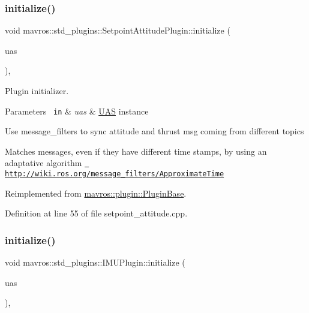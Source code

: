 \subsubsection{\texorpdfstring{initialize()}{initialize()}\hspace{0.1cm}{\footnotesize\ttfamily [31/41]}}
{\footnotesize\ttfamily void mavros\+::std\+\_\+plugins\+::\+Setpoint\+Attitude\+Plugin\+::initialize (\begin{DoxyParamCaption}\item[{\mbox{\hyperlink{classmavros_1_1UAS}{U\+AS}} \&}]{uas }\end{DoxyParamCaption})\hspace{0.3cm}{\ttfamily [inline]}, {\ttfamily [virtual]}}



Plugin initializer. 


\begin{DoxyParams}[1]{Parameters}
\mbox{\texttt{ in}}  & {\em uas} & {\ttfamily \mbox{\hyperlink{classmavros_1_1UAS}{U\+AS}}} instance \\
\hline
\end{DoxyParams}
Use message\+\_\+filters to sync attitude and thrust msg coming from different topics

Matches messages, even if they have different time stamps, by using an adaptative algorithm \href{http://wiki.ros.org/message_filters/ApproximateTime}{\texttt{ http\+://wiki.\+ros.\+org/message\+\_\+filters/\+Approximate\+Time}}

Reimplemented from \mbox{\hyperlink{group__plugin_gad5313a41da4d26acbbabf008cdc21e82}{mavros\+::plugin\+::\+Plugin\+Base}}.



Definition at line 55 of file setpoint\+\_\+attitude.\+cpp.

\mbox{\label{group__plugin_ga93f6f8e41038c821e395ef26bd27c905}} 
\subsubsection{\texorpdfstring{initialize()}{initialize()}\hspace{0.1cm}{\footnotesize\ttfamily [32/41]}}
{\footnotesize\ttfamily void mavros\+::std\+\_\+plugins\+::\+I\+M\+U\+Plugin\+::initialize (\begin{DoxyParamCaption}\item[{\mbox{\hyperlink{classmavros_1_1UAS}{U\+AS}} \&}]{uas }\end{DoxyParamCaption})\hspace{0.3cm}{\ttfamily [inline]}, {\ttfamily [virtual]}}



